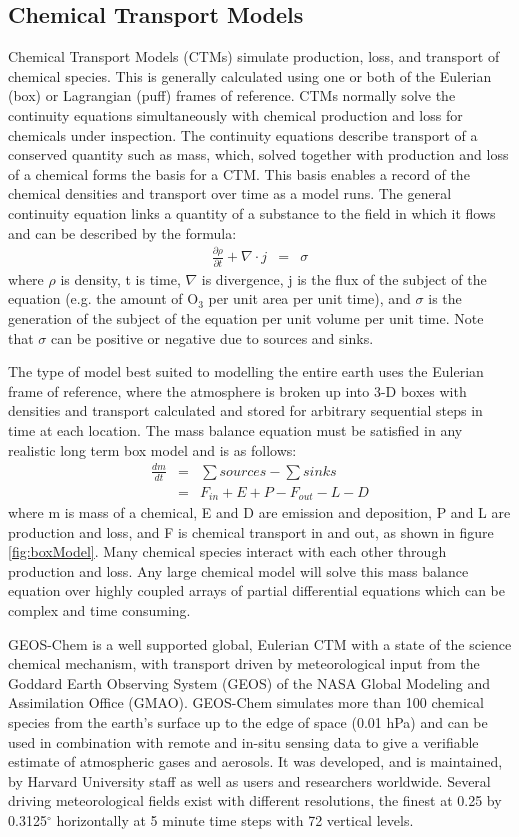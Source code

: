 \subsection{Chemical Transport Models}
Chemical Transport Models (CTMs) simulate production, loss, and transport of chemical species.
This is generally calculated using one or both of the Eulerian (box) or Lagrangian (puff) frames of reference.
CTMs normally solve the continuity equations simultaneously with chemical production and loss for chemicals under inspection. 
The continuity equations describe transport of a conserved quantity such as mass, which, solved together with production and loss of a chemical forms the basis for a CTM.
This basis enables a record of the chemical densities and transport over time as a model runs.
The general continuity equation links a quantity of a substance to the field in which it flows and can be described by the formula:
\begin{eqnarray*}
    \frac{\partial \rho}{\partial t} + \nabla \cdot j &=& \sigma 
\end{eqnarray*}
where $\rho$ is density, t is time, $\nabla$ is divergence, j is the flux of the subject of the equation (e.g. the amount of O$_3$ per unit area per unit time), and $\sigma$ is the generation of the subject of the equation per unit volume per unit time.
Note that $\sigma$ can be positive or negative due to sources and sinks.

The type of model best suited to modelling the entire earth uses the Eulerian frame of reference, where the atmosphere is broken up into 3-D boxes with densities and transport calculated and stored for arbitrary sequential steps in time at each location.
The mass balance equation must be satisfied in any realistic long term box model and is as follows: 
\begin{eqnarray*}
    \frac{dm}{dt} &=& \sum{sources}-\sum{sinks} \\
    &=& F_{in} + E + P - F_{out} - L - D 
\end{eqnarray*}
where m is mass of a chemical, E and D are emission and deposition, P and L are production and loss, and F is chemical transport in and out, as shown in figure \ref{fig:boxModel}.
Many chemical species interact with each other through production and loss. 
Any large chemical model will solve this mass balance equation over highly coupled arrays of partial differential equations which can be complex and time consuming.

GEOS-Chem is a well supported global, Eulerian CTM with a state of the science chemical mechanism, with transport driven by meteorological input from the Goddard Earth Observing System (GEOS) of the NASA Global Modeling and Assimilation Office (GMAO).
GEOS-Chem simulates more than 100 chemical species from the earth's surface up to the edge of space (0.01 hPa) and can be used in combination with remote and in-situ sensing data to give a verifiable estimate of atmospheric gases and aerosols.
It was developed, and is maintained, by Harvard University staff as well as users and researchers worldwide. 
Several driving meteorological fields exist with different resolutions, the finest at 0.25 by 0.3125$^\circ$ horizontally at 5 minute time steps with 72 vertical levels.

